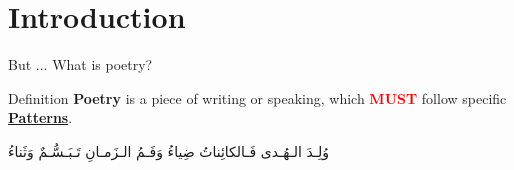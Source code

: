 \section{Introduction}



\begin{frame}[fragile]{But ... What is poetry?}

\begin{block}{Definition}
{\small \textbf{Poetry} is a piece of writing or speaking, which
\textbf{\textcolor{red}{MUST}} follow specific
\alert{\underline{\textbf{Patterns}}}.
}\end{block}


\begin{example}
	\begin{center}
		\begin{Arabic}
			وُلِـدَ الـهُـدى فَـالكائِناتُ ضِياءُ\hspace{3em}  وَفَـمُ الـزَمـانِ تَـبَـسُّـمٌ وَثَناءُ
		\end{Arabic}
	\end{center}
\end{example}

\end{frame}

